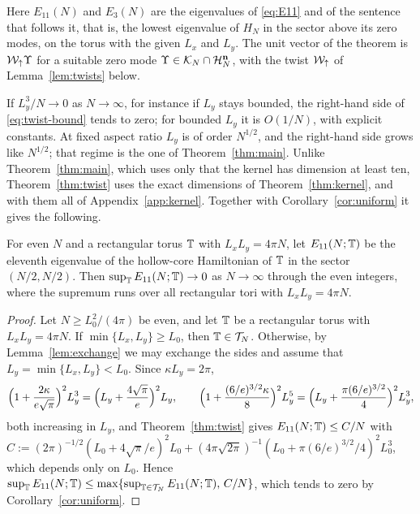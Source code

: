 Here $E_{11}(N)$ and $E_3(N)$ are the eigenvalues of \eqref{eq:E11} and of the sentence that follows it, that is, the
lowest eigenvalue of $H_N$ in the sector above its zero modes, on the torus with the given $L_x$ and $L_y$. The unit
vector of the theorem is $\mathcal W_{\uparrow}\Upsilon$ for a suitable zero mode $\Upsilon\in\mathcal K_N\cap\mathcal{H}_N^{\mathbf{n}}$, with the
twist $\mathcal W_{\uparrow}$ of Lemma~\ref{lem:twists} below.

If $L_y^3/N\to0$ as $N\to\infty$, for instance if $L_y$ stays bounded, the right-hand side of \eqref{eq:twist-bound}
tends to zero; for bounded $L_y$ it is $O(1/N)$, with explicit constants. At fixed aspect ratio $L_y$ is of order
$N^{1/2}$, and the right-hand side grows like $N^{1/2}$; that regime is the one of Theorem~\ref{thm:main}. Unlike
Theorem~\ref{thm:main}, which uses only that the kernel has dimension at least ten, Theorem~\ref{thm:twist} uses the exact
dimensions of Theorem~\ref{thm:kernel}, and with them all of Appendix~\ref{app:kernel}. Together with
Corollary~\ref{cor:uniform} it gives the following.

\begin{corollary}\label{cor:alltori}
For even $N$ and a rectangular torus $\mathbb{T}$ with $L_xL_y=4\pi N$, let $E_{11}(N;\mathbb{T})$ be the eleventh eigenvalue of
the hollow-core Hamiltonian of $\mathbb{T}$ in the sector $(N/2,N/2)$. Then $\sup_{\mathbb{T}} E_{11}(N;\mathbb{T})\to0$ as $N\to\infty$
through the even integers, where the supremum runs over all rectangular tori with $L_xL_y=4\pi N$.
\end{corollary}

\begin{proof}
Let $N\ge L_0^2/(4\pi)$ be even, and let $\mathbb{T}$ be a rectangular torus with $L_xL_y=4\pi N$. If
$\min\{L_x,L_y\}\ge L_0$, then $\mathbb{T}\in\mathcal T_N$. Otherwise, by Lemma~\ref{lem:exchange} we may exchange the sides
and assume that $L_y=\min\{L_x,L_y\}<L_0$. Since $\kappa L_y=2\pi$,
\[
\Bigl(1+\frac{2\kappa}{e\sqrt\pi}\Bigr)^2L_y^3=\Bigl(L_y+\frac{4\sqrt\pi}e\Bigr)^2L_y,\qquad
\Bigl(1+\frac{(6/e)^{3/2}\kappa}8\Bigr)^2L_y^5=\Bigl(L_y+\frac{\pi(6/e)^{3/2}}4\Bigr)^2L_y^3,
\]
both increasing in $L_y$, and Theorem~\ref{thm:twist} gives $E_{11}(N;\mathbb{T})\le C/N$ with
$C:=(2\pi)^{-1/2}(L_0+4\sqrt\pi/e)^2L_0+(4\pi\sqrt{2\pi})^{-1}(L_0+\pi(6/e)^{3/2}/4)^2L_0^3$, which depends only on $L_0$.
Hence $\sup_{\mathbb{T}} E_{11}(N;\mathbb{T})\le\max\{\sup_{\mathbb{T}\in\mathcal T_N}E_{11}(N;\mathbb{T}),\,C/N\}$, which tends to zero by
Corollary~\ref{cor:uniform}.
\end{proof}


